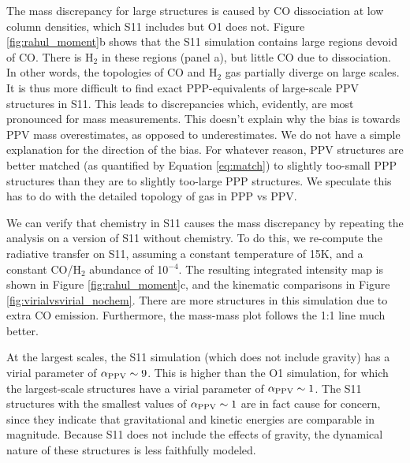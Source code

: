 The mass discrepancy for large structures is caused by CO dissociation at low column densities, which S11 includes but O1 does not. Figure \ref{fig:rahul_moment}b shows that the S11 simulation contains large regions devoid of CO. There is H$_2$ in these regions (panel a), but little CO due to dissociation. In other words, the topologies of CO and H$_2$ gas partially diverge on large scales. It is thus more difficult to find exact PPP-equivalents of large-scale PPV structures in S11. This leads to discrepancies which, evidently, are most pronounced for mass measurements. This doesn't explain why the bias is towards PPV mass overestimates, as opposed to underestimates. We do not have a simple explanation for the direction of the bias. For whatever reason, PPV structures are better matched (as quantified by Equation \ref{eq:match}) to slightly too-small PPP structures than they are to slightly too-large PPP structures. We speculate this has to do with the detailed topology of gas in PPP vs PPV.

We can verify that chemistry in S11 causes the mass discrepancy by repeating the analysis on a version of S11 without chemistry. To do this, we re-compute the radiative transfer on S11, assuming a constant temperature of 15K, and a constant CO/H$_2$ abundance of 10$^{-4}$. The resulting integrated intensity map is shown in Figure \ref{fig:rahul_moment}c, and the kinematic comparisons in Figure \ref{fig:virialvsvirial_nochem}. There are more structures in this simulation due to extra CO emission. Furthermore, the mass-mass plot follows the 1:1 line much better.

At the largest scales, the S11 simulation (which does not include gravity) has a virial parameter of $\alpha_{\rm PPV} \sim 9$. This is higher than the O1 simulation, for which the largest-scale structures have a virial parameter of $\alpha_{\rm PPV} \sim 1$. The S11 structures with the smallest values of $\alpha_{\rm PPV} \sim 1$ are in fact cause for concern, since they indicate that gravitational and kinetic energies are comparable in magnitude. Because S11 does not include the effects of gravity, the dynamical nature of these structures is less faithfully modeled.

